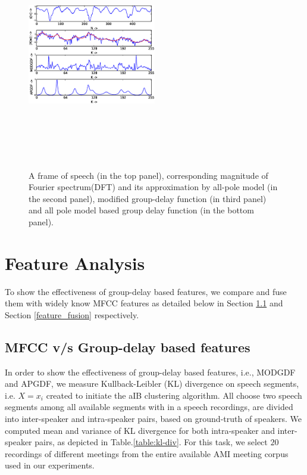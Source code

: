 \documentclass[conference]{IEEEtran}
\begin{document}
\begin{figure}[h]
\centering
\includegraphics[width=0.5\textwidth,height=10cm]{figures/apSpectrum.eps}
\caption{ A frame of speech (in the top panel), corresponding magnitude of
Fourier spectrum(DFT) and its approximation by all-pole model (in the second
panel), modified group-delay function (in third panel) and all pole model based
group delay function (in the bottom panel).}
\label{fig:all-pole}
\end{figure}



\section{Feature Analysis}
\label{feature_analysis_and_fusion}

To show the effectiveness of group-delay based features, we compare and fuse
them with widely know MFCC features as detailed below in Section
\ref{feature_analysis} and Section \ref{feature_fusion} respectively.

\subsection{MFCC v/s Group-delay based features}
\label{feature_analysis}
In order to show the effectiveness of group-delay based features, i.e., MODGDF
and APGDF, we measure Kullback-Leibler (KL) divergence on speech segments, i.e.
$X={x_i}$ created to initiate the aIB clustering algorithm. All choose two
speech segments among all available segments with in a speech recordings, are
divided into inter-speaker and intra-speaker pairs, based on ground-truth of
speakers. We computed mean and variance of KL divergence for both intra-speaker
and inter-speaker pairs, as depicted in Table.\ref{table:kl-div}. For this task,
we select $20$ recordings of different meetings from the entire available AMI
meeting corpus used in our experiments. 
\end{document}
